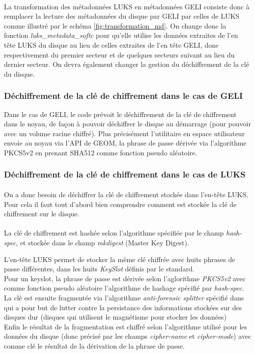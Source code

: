 \paragraph{}
La transformation des métadonnées LUKS en métadonnées GELI consiste donc à 
remplacer la lecture des métadonnées du disque par GELI par celles de LUKS 
comme illustré par le schéma \ref{fig:transformation_md}. On change donc la 
fonction {\em luks\_metadata\_softc} pour qu'elle utilise les données extraites
de l'en tête LUKS du disque au lieu de celles extraites de l'en tête GELI, donc
respectivement du premier secteur et de quelques secteurs suivant au lieu du 
dernier secteur. On devra également changer la gestion du déchiffrement de la 
clé du disque.


\subsubsection{Déchiffrement de la clé de chiffrement dans le cas de GELI}
Dans le cas de GELI, le code prévoit le déchiffrement de la clé de chiffrement 
dans le noyau, de façon à pouvoir déchiffrer le disque au démarrage (pour 
pouvoir avec un volume racine chiffré). Plus précisément l'utilitaire en espace
utilisateur envoie au noyau via l'API de GEOM, la phrase de passe dérivée via
l'algorithme PKCS5v2 en prenant SHA512 comme fonction pseudo aléatoire.


\subsubsection{Déchiffrement de la clé de chiffrement dans le cas de LUKS}
\paragraph{}
On a donc besoin de déchiffrer la clé de chiffrement stockée dans l'en-tête LUKS.
Pour cela il faut tout d'abord bien comprendre comment est stockée la clé de 
chiffrement sur le disque.

\paragraph{}
La clé de chiffrement est hashée selon l'algorithme spécifiée par le champ
{\em hash-spec}, et stockée dans le champ {\em mkdigest} (Master Key Digest).

L'en-tête LUKS permet de stocker la même clé chiffrée avec huits phrases de passe
différentes, dans les huits {\em KeySlot} définis par le standard.
\\
Pour un keyslot, la phrase de passe est dérivée selon l'aglorithme {\em PKCS5v2}
avec comme fonction pseudo aléatoire l'algorithme de hashage spécifié par 
{\em hash-spec}. La clé est ensuite fragmentée via l'algorithme 
{\em anti-forensic splitter} spécifié dans \cite{AFsplitting} qui a pour but de
lutter contre la persistance des informations stockées sur des disques dur
(disques qui utilisent le magnétisme pour stocker les données)
\\
Enfin le résultat de la fragmentation est chiffré selon l'algorithme utilisé 
pour les données du disque (donc précisé par les champs {\em cipher-name} et 
{\em cipher-mode}) avec comme clé le résultat de la dérivation de la phrase de
passe.

